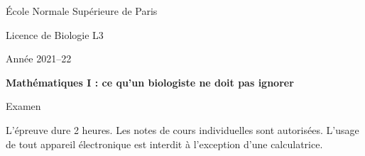 \documentclass[french, 12pt]{article}
\title{}
\begin{document}

\begin{centering}
  \footnotesize{\sc École Normale Supérieure de Paris} 
  
  \bigskip
  \footnotesize{\sc Licence de Biologie L3}
  
  \bigskip
  \footnotesize{\sc Année 2021–22}
  
  \bigskip
  {\bf Mathématiques I : ce qu’un biologiste ne doit pas ignorer} 
  
  \bigskip
  {\sc Examen}
  
\end{centering}

\bigskip
L'épreuve dure 2 heures. 
Les notes de cours individuelles sont autorisées.
L’usage de tout appareil électronique est interdit à l’exception d’une calculatrice.



\newpage



\end{document}

